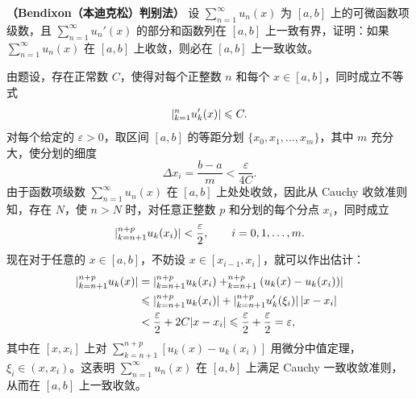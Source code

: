 \begin{xexample}[14.1.4]
\textbf{（Bendixon（本迪克松）判别法）} 设 $\displaystyle\sum_{n=1}^{\infty}u_n(x)$ 为 $[a,b]$ 上的可微函数项级数，且 $\displaystyle\sum_{n=1}^{\infty}u_n'(x)$ 的部分和函数列在 $[a,b]$ 上一致有界，证明：如果 $\displaystyle\sum_{n=1}^{\infty}u_n(x)$ 在 $[a,b]$ 上收敛，则必在 $[a,b]$ 上一致收敛。
\end{xexample}
\begin{xproof}
由题设，存在正常数 $C$，使得对每个正整数 $n$ 和每个 $x\in[a,b]$，同时成立不等式
\[
  \lvert\relax_{k=1}^{n}u_k'(x)\rvert\leqslant C.
\]
对每个给定的 $\varepsilon>0$，取区间 $[a,b]$ 的等距分划 $\{x_0,x_1,\ldots,x_m\}$，其中 $m$ 充分大，使分划的细度
\[
  \Delta x_i=\frac{b-a}{m}<\frac{\varepsilon}{4C}.
\]
由于函数项级数 $\displaystyle\sum_{n=1}^{\infty}u_n(x)$ 在 $[a,b]$ 上处处收敛，因此从 Cauchy 收敛准则知，存在 $N$，使 $n>N$ 时，对任意正整数 $p$ 和分划的每个分点 $x_i$，同时成立
\[
  \lvert\relax_{k=n+1}^{n+p}u_k(x_i)\rvert<\frac{\varepsilon}{2},\qquad i=0,1,\ldots,m.
\]
现在对于任意的 $x\in[a,b]$，不妨设 $x\in[x_{i-1},x_i]$，就可以作出估计：
\[
\begin{aligned}
  \lvert\relax_{k=n+1}^{n+p}u_k(x)\rvert
  &=\lvert\relax_{k=n+1}^{n+p}u_k(x_i)+\relax_{k=n+1}^{n+p}(u_k(x)-u_k(x_i))\rvert\\
  &\leqslant \lvert\relax_{k=n+1}^{n+p}u_k(x_i)\rvert+\lvert\relax_{k=n+1}^{n+p}u_k'(\xi_i)\rvert\,\lvert x-x_i\rvert\\
  &<\frac{\varepsilon}{2}+2C\lvert x-x_i\rvert\leqslant\frac{\varepsilon}{2}+\frac{\varepsilon}{2}=\varepsilon,
\end{aligned}
\]
其中在 $[x,x_i]$ 上对 $\displaystyle\sum_{k=n+1}^{n+p}[u_k(x)-u_k(x_i)]$ 用微分中值定理，$\xi_i\in(x,x_i)$。这表明 $\displaystyle\sum_{n=1}^{\infty}u_n(x)$ 在 $[a,b]$ 上满足 Cauchy 一致收敛准则，从而在 $[a,b]$ 上一致收敛。
\end{xproof}

